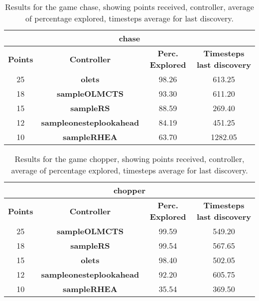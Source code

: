 \begin{table*}[!t]
\begin{center}
\begin{tabular}{|c|c|c|c|}
\multicolumn{4}{c}{\textbf{chase}}\\
\hline
\textbf{Points} & \textbf{Controller} & \textbf{Perc. Explored} &  \textbf{Timesteps last discovery}\\
\hline
25 & \textbf{olets} & 98.26 & 613.25
 \\
\hline
18 & \textbf{sampleOLMCTS} & 93.30 & 611.20
 \\
\hline
15 & \textbf{sampleRS} & 88.59 & 269.40
 \\
\hline
12 & \textbf{sampleonesteplookahead} & 84.19 & 451.25
 \\
\hline
10 & \textbf{sampleRHEA} & 63.70 & 1282.05
 \\
\hline
\end{tabular}
\caption{Results for the game chase, showing points received, controller, average of percentage explored, timesteps average for last discovery.}
\label{tab:weights}
\end{center}
\end{table*}
\begin{table*}[!t]
\begin{center}
\begin{tabular}{|c|c|c|c|}
\multicolumn{4}{c}{\textbf{chopper}}\\
\hline
\textbf{Points} & \textbf{Controller} & \textbf{Perc. Explored} &  \textbf{Timesteps last discovery}\\
\hline
25 & \textbf{sampleOLMCTS} & 99.59 & 549.20
 \\
\hline
18 & \textbf{sampleRS} & 99.54 & 567.65
 \\
\hline
15 & \textbf{olets} & 98.40 & 502.05
 \\
\hline
12 & \textbf{sampleonesteplookahead} & 92.20 & 605.75
 \\
\hline
10 & \textbf{sampleRHEA} & 35.54 & 369.50
 \\
\hline
\end{tabular}
\caption{Results for the game chopper, showing points received, controller, average of percentage explored, timesteps average for last discovery.}
\label{tab:weights}
\end{center}
\end{table*}
